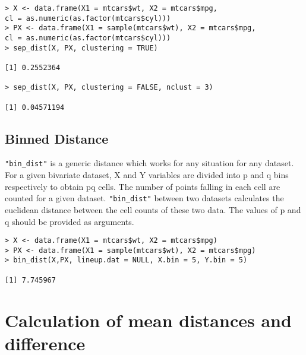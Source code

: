 \begin{verbatim}
> X <- data.frame(X1 = mtcars$wt, X2 = mtcars$mpg, 
cl = as.numeric(as.factor(mtcars$cyl)))
> PX <- data.frame(X1 = sample(mtcars$wt), X2 = mtcars$mpg, 
cl = as.numeric(as.factor(mtcars$cyl)))
> sep_dist(X, PX, clustering = TRUE)

[1] 0.2552364

> sep_dist(X, PX, clustering = FALSE, nclust = 3)

[1] 0.04571194
\end{verbatim}

\subsection{Binned Distance}\label{binned-distance}

\texttt{"bin\_dist"} is a generic distance which works for any situation
for any dataset. For a given bivariate dataset, X and Y variables are
divided into p and q bins respectively to obtain pq cells. The number of
points falling in each cell are counted for a given dataset.
\texttt{"bin\_dist"} between two datasets calculates the euclidean
distance between the cell counts of these two data. The values of p and
q should be provided as arguments.

%

\begin{verbatim}
> X <- data.frame(X1 = mtcars$wt, X2 = mtcars$mpg)
> PX <- data.frame(X1 = sample(mtcars$wt), X2 = mtcars$mpg)
> bin_dist(X,PX, lineup.dat = NULL, X.bin = 5, Y.bin = 5)

[1] 7.745967
\end{verbatim}

\section{Calculation of mean distances and difference}

